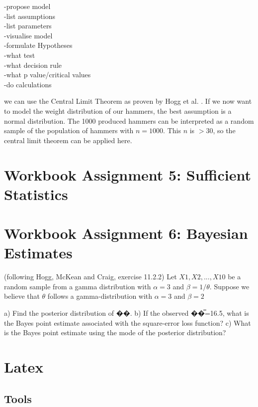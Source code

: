 -propose model\\
-list assumptions\\
-list parameters\\
-visualise model\\

-formulate Hypotheses\\
-what test\\
-what decision rule\\
-what p value/critical values\\
-do calculations




we can use the Central Limit Theorem as proven by Hogg et al. \cite[Theorem~5.3.1]{hogg}. 
If we now want to model the weight distribution of our hammers, the best assumption is a normal distribution. The 1000 produced hammers can be interpreted as a random sample of the population of hammers with $n = 1000$. This $n$ is $>30$, so the central limit theorem can be applied here. 


\chapter{Workbook Assignment 5: Sufficient Statistics}	
\chapter{Workbook Assignment 6: Bayesian Estimates}	

(following Hogg, McKean and Craig, exercise 11.2.2)
Let $X1, X2, ... , X10$ be a random sample from a gamma distribution with $\alpha =3$ and $\beta =1/\theta$. Suppose we believe that $\theta$ follows a gamma-distribution with $\alpha =3$ and $\beta = 2$

a) Find the posterior distribution of ��.
b) If the observed ��̅=16.5, what is the Bayes point estimate associated with the square-error loss function?
c) What is the Bayes point estimate using the mode of the posterior distribution?





\chapter{Latex}

\section{Tools}

